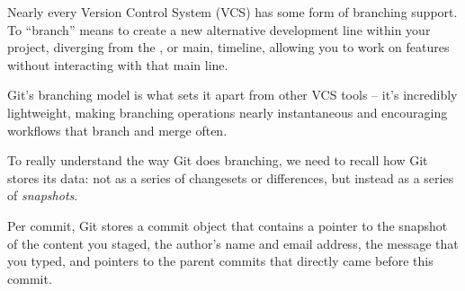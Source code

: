 Nearly every Version Control System (VCS) has some form of branching support. To ``branch'' means to create a new alternative development line within your project, diverging from the , or main, timeline, allowing you to work on features without interacting with that main line.

Git's branching model is what sets it apart from other VCS tools -- it's incredibly lightweight, making branching operations nearly instantaneous and encouraging workflows that branch and merge often. \newline

To really understand the way Git does branching, we need to recall how Git stores its data: not as a series of changesets or differences, but instead as a series of \emph{snapshots}.

Per commit, Git stores a commit object that contains a pointer to the snapshot of the content you staged, the author's name and email address, the message that you typed, and pointers to the parent commits that directly came before this commit.

